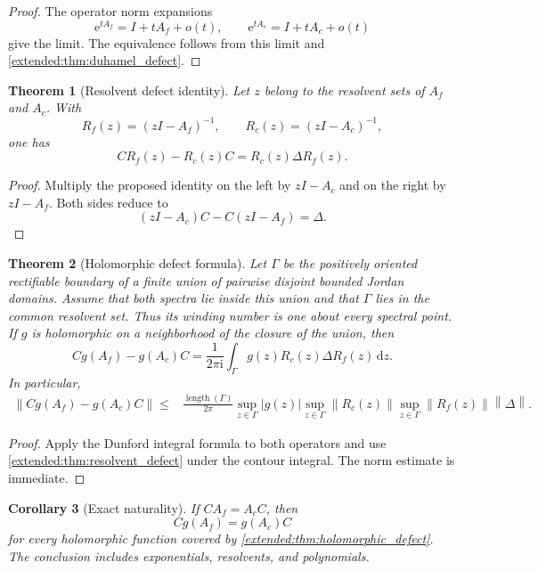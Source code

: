 \documentclass[11pt,a4paper]{article}
\newtheorem{theorem}{Theorem}[section]
\newtheorem{corollary}[theorem]{Corollary}
\theoremstyle{definition}
\theoremstyle{remark}
\newcommand{\norm}[1]{\left\lVert#1\right\rVert}
\newcommand{\e}{\mathrm e}
\newcommand{\ii}{\mathrm i}
\newcommand{\dd}{\,\mathrm d}
\newcommand{\abs}[1]{\left\lvert#1\right\rvert}
\begin{document}
\begin{proof}
The operator norm expansions
\[
\e^{tA_f}=I+tA_f+o(t),
\qquad
\e^{tA_c}=I+tA_c+o(t)
\]
give the limit. The equivalence follows from this limit and \cref{extended:thm:duhamel_defect}.
\end{proof}

\begin{theorem}[Resolvent defect identity]\label{extended:record:012}\label{extended:thm:resolvent_defect}
Let \(z\) belong to the resolvent sets of \(A_f\) and \(A_c\). With
\[
R_f(z)=(zI-A_f)^{-1},
\qquad
R_c(z)=(zI-A_c)^{-1},
\]
one has
\[
CR_f(z)-R_c(z)C
=
R_c(z)\Delta R_f(z).
\]
\end{theorem}

\begin{proof}
Multiply the proposed identity on the left by \(zI-A_c\) and on the right by \(zI-A_f\). Both sides reduce to
\[
(zI-A_c)C-C(zI-A_f)=\Delta.
\]
\end{proof}

\begin{theorem}[Holomorphic defect formula]\label{extended:record:013}\label{extended:thm:holomorphic_defect}
Let \(\Gamma\) be the positively oriented rectifiable boundary of a finite union of pairwise disjoint bounded Jordan domains. Assume that both spectra lie inside this union and that \(\Gamma\) lies in the common resolvent set. Thus its winding number is one about every spectral point. If \(g\) is holomorphic on a neighborhood of the closure of the union, then
\[
Cg(A_f)-g(A_c)C
=
\frac{1}{2\pi\ii}
\int_\Gamma
 g(z)R_c(z)\Delta R_f(z)
\dd z.
\]
In particular,
\[
\begin{aligned}
\norm{Cg(A_f)-g(A_c)C}
\leq{}&
\frac{\operatorname{length}(\Gamma)}{2\pi}
\sup_{z\in\Gamma}\abs{g(z)}
\sup_{z\in\Gamma}\norm{R_c(z)}
\sup_{z\in\Gamma}\norm{R_f(z)}
\norm\Delta.
\end{aligned}
\]
\end{theorem}

\begin{proof}
Apply the Dunford integral formula to both operators and use \cref{extended:thm:resolvent_defect} under the contour integral. The norm estimate is immediate.
\end{proof}

\begin{corollary}[Exact naturality]\label{extended:record:014}\label{extended:cor:exact_naturality}
If \(CA_f=A_cC\), then
\[
Cg(A_f)=g(A_c)C
\]
for every holomorphic function covered by \cref{extended:thm:holomorphic_defect}. The conclusion includes exponentials, resolvents, and polynomials.
\end{corollary}
\end{document}
